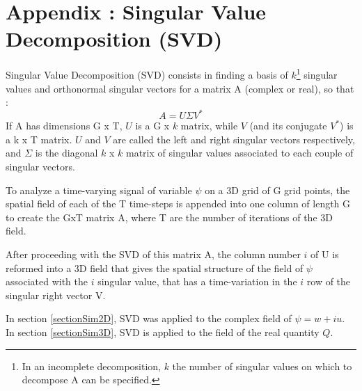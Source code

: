 \section{Appendix : Singular Value Decomposition (SVD)}
\label{annexeSVD}
Singular Value Decomposition (SVD) consists in finding a basis of $k$\footnote{In an incomplete decomposition, $k$ the number of singular values on which to decompose A can be specified.} singular values and orthonormal singular vectors for a matrix A (complex or real), so that :
\begin{equation}
A = U \Sigma V^* 
\end{equation}
If A has dimensions G x T, $U$ is a G x $k$ matrix, while $V$ (and its conjugate $V^*$) is a k x T matrix. $U$ and $V$ are called the left and right singular vectors respectively, and $\Sigma$ is the diagonal $k$ x $k$ matrix of singular values associated to each couple of singular vectors.

To analyze a time-varying signal of variable $\psi$ on a 3D grid of G grid points, the spatial field of each of the T time-steps is appended into one column of length G to create the GxT matrix A, where T are the number of iterations of the 3D field. 

After proceeding with the SVD of this matrix A, the column number $i$ of U is reformed into a 3D field that gives the spatial structure of the field of $\psi$ associated with the $i$ singular value, that has a time-variation in the $i$ row of the singular right vector V.

In section \ref{sectionSim2D}, SVD was applied to the complex field of $\psi=w+iu$. %
In section \ref{sectionSim3D}, SVD is applied to the field of the real quantity $Q$.

